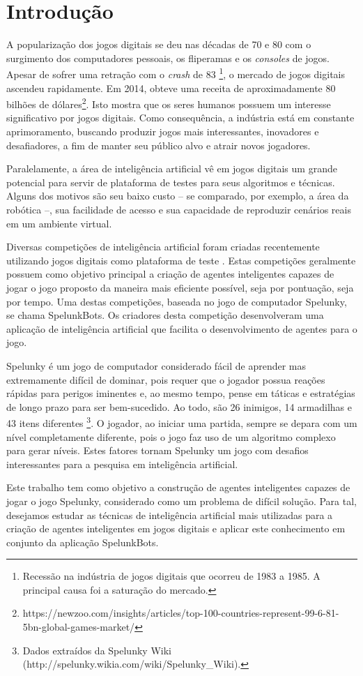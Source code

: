 \chapter{\label{chap:introduction}Introdução}
A popularização dos jogos digitais se deu nas décadas de 70 e 80 com o
surgimento dos computadores pessoais, os fliperamas e os \textit{consoles} de
jogos. Apesar de sofrer uma retração com o \textit{crash} de 83
\footnote{Recessão na indústria de jogos digitais que ocorreu de 1983 a 1985. A
principal causa foi a saturação do mercado.}, o mercado de jogos digitais
ascendeu rapidamente. Em 2014, obteve uma receita de aproximadamente 80 bilhões
de dólares\footnote{https://newzoo.com/insights/articles/top-100-countries-represent-99-6-81-5bn-global-games-market/}.
Isto mostra que os seres humanos possuem um interesse significativo por jogos
digitais. Como consequência, a indústria está em constante aprimoramento,
buscando produzir jogos mais interessantes, inovadores e desafiadores, a fim de
manter seu público alvo e atrair novos jogadores.

Paralelamente, a área de inteligência artificial vê em jogos digitais um grande
potencial para servir de plataforma de testes para seus algoritmos e técnicas.
Alguns dos motivos são seu baixo custo -- se comparado, por exemplo, a área da
robótica --, sua facilidade de acesso e sua capacidade de reproduzir cenários
reais em um ambiente virtual.

Diversas competições de inteligência artificial foram criadas recentemente
utilizando jogos digitais como plataforma de teste \cite{GameAiCompetition}.
Estas competições geralmente possuem como objetivo principal a criação de
agentes inteligentes capazes de jogar o jogo proposto da maneira mais eficiente
possível, seja por pontuação, seja por tempo. Uma destas competições, baseada no
jogo de computador Spelunky, se chama SpelunkBots. Os criadores desta competição
desenvolveram uma aplicação de inteligência artificial que facilita o
desenvolvimento de agentes para o jogo.

Spelunky é um jogo de computador considerado fácil de aprender mas extremamente
difícil de dominar, pois requer que o jogador possua reações rápidas para
perigos iminentes e, ao mesmo tempo, pense em táticas e estratégias de longo
prazo para ser bem-sucedido. Ao todo, são 26 inimigos, 14 armadilhas e 43 itens
diferentes \footnote{Dados extraídos da Spelunky Wiki
(http://spelunky.wikia.com/wiki/Spelunky\_Wiki).}. O jogador, ao iniciar uma
partida, sempre se depara com um nível completamente diferente, pois o jogo faz
uso de um algoritmo complexo para gerar níveis. Estes fatores tornam Spelunky um
jogo com desafios interessantes para a pesquisa em inteligência artificial.

Este trabalho tem como objetivo a construção de agentes inteligentes capazes de
jogar o jogo Spelunky, considerado como um problema de difícil solução. Para
tal, desejamos estudar as técnicas de inteligência artificial mais utilizadas
para a criação de agentes inteligentes em jogos digitais e aplicar este
conhecimento em conjunto da aplicação SpelunkBots.
